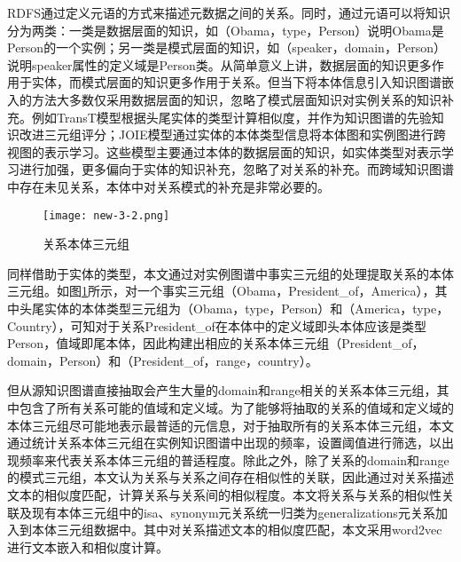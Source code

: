 RDFS通过定义元语的方式来描述元数据之间的关系。同时，通过元语可以将知识分为两类：一类是数据层面的知识，如（Obama，type，Person）说明Obama是Person的一个实例；另一类是模式层面的知识，如（speaker，domain，Person）说明speaker属性的定义域是Person类。从简单意义上讲，数据层面的知识更多作用于实体，而模式层面的知识更多作用于关系。但当下将本体信息引入知识图谱嵌入的方法大多数仅采用数据层面的知识，忽略了模式层面知识对实例关系的知识补充。例如TransT\cite{ma2017transt}模型根据头尾实体的类型计算相似度，并作为知识图谱的先验知识改进三元组评分；JOIE\cite{hao2019universal}模型通过实体的本体类型信息将本体图和实例图进行跨视图的表示学习。这些模型主要通过本体的数据层面的知识，如实体类型对表示学习进行加强，更多偏向于实体的知识补充，忽略了对关系的补充。而跨域知识图谱中存在未见关系，本体中对关系模式的补充是非常必要的。
\begin{figure}[h]
  \centering
  \texttt{[image: new-3-2.png]}
  \caption{关系本体三元组}
  \label{fig:3-2}
\end{figure}

同样借助于实体的类型，本文通过对实例图谱中事实三元组的处理提取关系的本体三元组。如图\ref{fig:3-2}所示，对一个事实三元组（Obama，President\_of，America），其中头尾实体的本体类型三元组为（Obama，type，Person）和（America，type，Country），可知对于关系President\_of在本体中的定义域即头本体应该是类型Person，值域即尾本体，因此构建出相应的关系本体三元组（President\_of，domain，Person）和（President\_of，range，country）。

但从源知识图谱直接抽取会产生大量的domain和range相关的关系本体三元组，其中包含了所有关系可能的值域和定义域。为了能够将抽取的关系的值域和定义域的本体三元组尽可能地表示最普适的元信息，对于抽取所有的关系本体三元组，本文通过统计关系本体三元组在实例知识图谱中出现的频率，设置阈值进行筛选，以出现频率来代表关系本体三元组的普适程度。除此之外，除了关系的domain和range的模式三元组，本文认为关系与关系之间存在相似性的关联，因此通过对关系描述文本的相似度匹配，计算关系与关系间的相似程度。本文将关系与关系的相似性关联及现有本体三元组中的isa、synonym元关系统一归类为generalizations元关系加入到本体三元组数据中。其中对关系描述文本的相似度匹配，本文采用word2vec进行文本嵌入和相似度计算。

